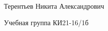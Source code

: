 Терентьев Никита Александрович
\begin{DoxyItemize}
\item Учебная группа КИ21-\/16/1б 
\end{DoxyItemize}